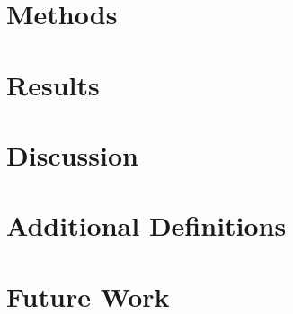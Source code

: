 \documentclass[twoside]{mtu.thesis}
\begin{document}
\chapter{Methods}
\lipsum[1-20]

\chapter{Results}
\lipsum[1-20]

\chapter{Discussion}
\lipsum[1-20]

\nocite{*}


\appendix

\chapter{Additional Definitions}
\lipsum[1-20]

\chapter{Future Work}
\lipsum[1-20]
\end{document}

